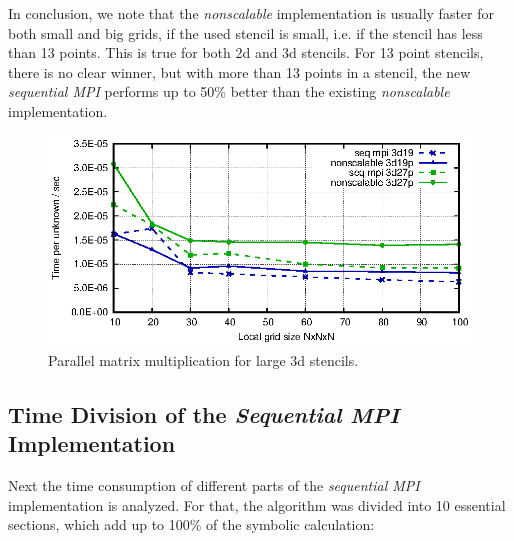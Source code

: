 In conclusion, we note that the \textit{nonscalable} implementation is usually faster for both small and big grids, if the used stencil is small, i.e. if the stencil has less than 13 points. This is true for both 2d and 3d stencils. For 13 point stencils, there is no clear winner, but with more than 13 points in a stencil, the new \textit{sequential MPI} performs up to 50\% better than the existing \textit{nonscalable} implementation.

\begin{figure}[tbp]
	\centering
	\vspace*{-2.5mm}\includegraphics[width=1\textwidth]{times_3dlarge}
	\caption{Parallel matrix multiplication for large 3d stencils.} 
	\label{fig:mat_ex_test_ex2_times_3dlarge}
\end{figure}

\subsection{Time Division of the \textit{Sequential MPI} Implementation}

Next the time consumption of different parts of the \textit{sequential MPI} implementation is analyzed. For that, the algorithm was divided into 10 essential sections, which add up to 100\% of the symbolic calculation:

